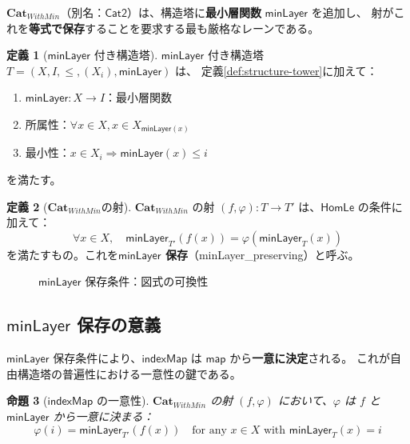 \documentclass[a4paper,11pt]{ltjsarticle}
\theoremstyle{definition}
\newtheorem{definition}{定義}[section]
\theoremstyle{plain}
\newtheorem{proposition}[definition]{命題}
\newcommand{\CatWithMin}{\mathbf{Cat}_{WithMin}}
\newcommand{\HomLe}{\mathsf{HomLe}}
\newcommand{\minLayer}{\mathsf{minLayer}}
\newcommand{\indexMap}{\mathsf{indexMap}}
\begin{document}
$\CatWithMin$（別名：$\mathsf{Cat2}$）は、構造塔に\textbf{最小層関数} $\minLayer$ を追加し、
射がこれを\textbf{等式で保存}することを要求する最も厳格なレーンである。

\begin{definition}[$\minLayer$ 付き構造塔]
\label{def:structure-tower-with-min}
$\minLayer$ 付き構造塔 $T = (X, I, \leq, (X_i), \minLayer)$ は、
定義\ref{def:structure-tower}に加えて：
\begin{enumerate}
  \item $\minLayer : X \to I$：最小層関数
  \item 所属性：$\forall x \in X, x \in X_{\minLayer(x)}$
  \item 最小性：$x \in X_i \Rightarrow \minLayer(x) \leq i$
\end{enumerate}
を満たす。
\end{definition}

\begin{definition}[$\CatWithMin$の射]
\label{def:hom-with-min}
$\CatWithMin$ の射 $(f, \varphi) : T \to T'$ は、$\HomLe$ の条件に加えて：
\[
  \forall x \in X, \quad \minLayer_{T'}(f(x)) = \varphi(\minLayer_T(x))
\]
を満たすもの。これを\textbf{$\minLayer$ 保存}（minLayer\_preserving）と呼ぶ。
\end{definition}

\begin{figure}[htbp]
\centering
{}
\caption{$\minLayer$ 保存条件：図式の可換性}
\label{fig:minlayer-preserving}
\end{figure}

\subsection{$\minLayer$ 保存の意義}

\begin{keypoint}
$\minLayer$ 保存条件により、$\indexMap$ は $\mathsf{map}$ から\textbf{一意に決定}される。
これが自由構造塔の普遍性における一意性の鍵である。
\end{keypoint}

\begin{proposition}[$\indexMap$ の一意性]
$\CatWithMin$ の射 $(f, \varphi)$ において、$\varphi$ は $f$ と $\minLayer$ から一意に決まる：
\[
  \varphi(i) = \minLayer_{T'}(f(x)) \quad \text{for any } x \in X \text{ with } \minLayer_T(x) = i
\]
\end{proposition}
\end{document}
